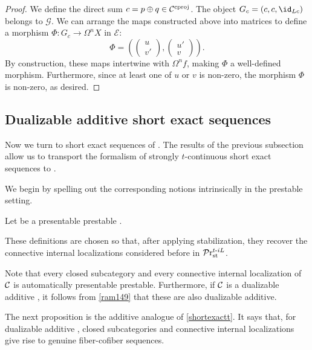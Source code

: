 \documentclass[a4paper,10pt, oneside]{amsart}
\begin{document}
\begin{proof}
We define the direct sum $c = p \oplus q \in \mathcal{C}^{\mathrm{cproj}}$. The object $G_c = (c, c, \id_{Lc})$ belongs to $\mathcal{G}$. We can arrange the maps constructed above into matrices to define a morphism $\Phi: G_c \to \Omega^n X$ in $\mathcal{E}$:
\[
\Phi = \left( \begin{pmatrix} u \\ v' \end{pmatrix}, \begin{pmatrix} u' \\ v \end{pmatrix} \right).
\]
By construction, these maps intertwine with $\Omega^n f$, making $\Phi$ a well-defined morphism. Furthermore, since at least one of $u$ or $v$ is non-zero, the morphism $\Phi$ is non-zero, as desired.


\end{proof}

	\subsection{Dualizable additive short exact sequences}
Now we turn to short exact sequences of \dualaddinfcats. The results of the previous subsection allow us to transport the formalism of strongly $t$-continuous short exact sequences to \dualaddinfcats. 

We begin by spelling out the corresponding notions intrinsically in the prestable setting.


	\begin{de}\label{defconnloc}
	Let \mcc be a presentable prestable \infcat.
	\end{de}
	These definitions are chosen so that, after applying stabilization, they recover the connective internal localizations considered before in $\mathcal{P}\mathrm{r}^{t\text{-}iL}_{\mathrm{st}}$.
	
	\begin{rem}
	
Note that every closed subcategory and every connective internal localization of $\mathcal{C}$ is automatically presentable prestable. Furthermore, if $\mathcal{C}$ is a dualizable additive \infcat, it follows from \cref{ram149} that these are also dualizable additive.
	\end{rem}
	The next proposition is the additive analogue of \cref{shortexactt}. It says that, for dualizable additive \infcats, closed subcategories and connective internal localizations give rise to genuine fiber-cofiber sequences.
	
\end{document}
